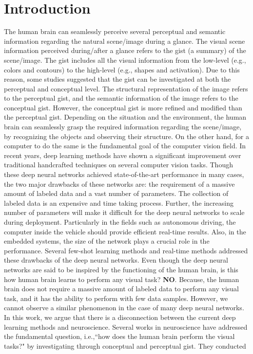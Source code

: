 \documentclass{article}
\begin{document}
\section{Introduction}
The human brain can seamlessly perceive several perceptual and semantic information regarding the natural scene/image during a glance. The visual scene information perceived during/after a glance refers to the gist (a summary) of the scene/image. The gist includes all the visual information from the low-level (e.g., colors and contours) to the high-level (e.g., shapes and activation). Due to this reason, some studies \cite{oliva2005gist} suggested that the gist can be investigated at both the perceptual and conceptual level. The structural representation of the image refers to the perceptual gist, and the semantic information of the image refers to the conceptual gist. However, the conceptual gist is more refined and modified than the perceptual gist. Depending on the situation and the environment, the human brain can seamlessly grasp the required information regarding the scene/image, by recognizing the objects and observing their structure. On the other hand, for a computer to do the same is the fundamental goal of the computer vision field. \newline
In recent years, deep learning methods have shown a significant improvement over traditional handcrafted techniques on several computer vision tasks. Though these deep neural networks achieved state-of-the-art performance in many cases, the two major drawbacks of these networks are: the requirement of a massive amount of labeled data and a vast number of parameters. The collection of labeled data is an expensive and time taking process. Further, the increasing number of parameters will make it difficult for the deep neural networks to scale during deployment. Particularly in the fields such as autonomous driving, the computer inside the vehicle should provide efficient real-time results. Also, in the embedded systems, the size of the network plays a crucial role in the performance. Several few-shot learning methods and real-time methods addressed these drawbacks of the deep neural networks.\newline
 Even though the deep neural networks are said to be inspired by the functioning of the human brain, is this how human brain learns to perform any visual task? \textbf{NO}. Because, the human brain does not require a massive amount of labeled data to perform any visual task, and it has the ability to perform with few data samples. However, we cannot observe a similar phenomenon in the case of many deep neural networks. In this work, we argue that there is a disconnection between the current deep learning methods and neuroscience. Several works\cite{rayner1998eye}\cite{oliva2000diagnostic}\cite{henderson2003human}\cite{evans2005perception}\cite{fei2007we} in neuroscience have addressed the fundamental question, i.e.,``how does the human brain perform the visual tasks?" by investigating through conceptual and perceptual gist. They conducted
\end{document}
